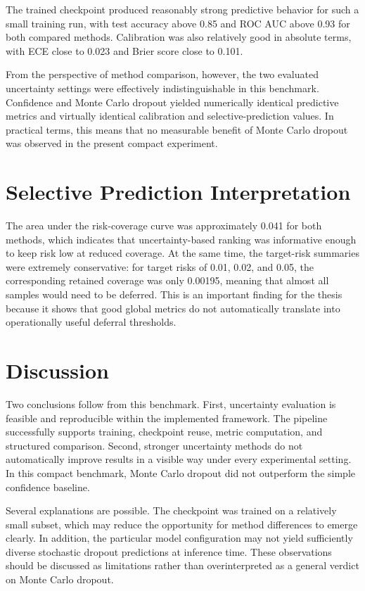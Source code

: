 The trained checkpoint produced reasonably strong predictive behavior for such a small training run, with test accuracy above 0.85 and ROC AUC above 0.93 for both compared methods. Calibration was also relatively good in absolute terms, with ECE close to 0.023 and Brier score close to 0.101.

From the perspective of method comparison, however, the two evaluated uncertainty settings were effectively indistinguishable in this benchmark. Confidence and Monte Carlo dropout yielded numerically identical predictive metrics and virtually identical calibration and selective-prediction values. In practical terms, this means that no measurable benefit of Monte Carlo dropout was observed in the present compact experiment.

\section{Selective Prediction Interpretation}

The area under the risk-coverage curve was approximately 0.041 for both methods, which indicates that uncertainty-based ranking was informative enough to keep risk low at reduced coverage. At the same time, the target-risk summaries were extremely conservative: for target risks of 0.01, 0.02, and 0.05, the corresponding retained coverage was only 0.00195, meaning that almost all samples would need to be deferred. This is an important finding for the thesis because it shows that good global metrics do not automatically translate into operationally useful deferral thresholds.

\section{Discussion}

Two conclusions follow from this benchmark. First, uncertainty evaluation is feasible and reproducible within the implemented framework. The pipeline successfully supports training, checkpoint reuse, metric computation, and structured comparison. Second, stronger uncertainty methods do not automatically improve results in a visible way under every experimental setting. In this compact benchmark, Monte Carlo dropout did not outperform the simple confidence baseline.

Several explanations are possible. The checkpoint was trained on a relatively small subset, which may reduce the opportunity for method differences to emerge clearly. In addition, the particular model configuration may not yield sufficiently diverse stochastic dropout predictions at inference time. These observations should be discussed as limitations rather than overinterpreted as a general verdict on Monte Carlo dropout.

